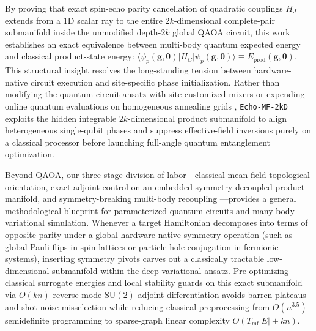\documentclass[10pt,a4paper]{article}
\begin{document}
By proving that exact spin-echo parity cancellation of quadratic couplings $H_J$ extends from a 1D scalar ray to the entire $2k$-dimensional complete-pair submanifold inside the unmodified depth-$2k$ global QAOA circuit, this work establishes an exact equivalence between multi-body quantum expected energy and classical product-state energy: $\langle\psi_p(\boldsymbol{g},\boldsymbol{\theta})|H_C|\psi_p(\boldsymbol{g},\boldsymbol{\theta})\rangle \equiv E_{\mathrm{prod}}(\boldsymbol{g},\boldsymbol{\theta})$. This structural insight resolves the long-standing tension between hardware-native circuit execution and site-specific phase initialization. Rather than modifying the quantum circuit ansatz with site-customized mixers \citep{egger2021warm,tate2023warm} or expending online quantum evaluations on homogeneous annealing grids \citep{sack2021quantum}, \texttt{Echo-MF-2kD} exploits the hidden integrable $2k$-dimensional product submanifold to align heterogeneous single-qubit phases and suppress effective-field inversions purely on a classical processor before launching full-angle quantum entanglement optimization.

Beyond QAOA, our three-stage division of labor---classical mean-field topological orientation, exact adjoint control on an embedded symmetry-decoupled product manifold, and symmetry-breaking multi-body recoupling \citep{dupont2022entanglement}---provides a general methodological blueprint for parameterized quantum circuits and many-body variational simulation. Whenever a target Hamiltonian decomposes into terms of opposite parity under a global hardware-native symmetry operation (such as global Pauli flips in spin lattices or particle-hole conjugation in fermionic systems), inserting symmetry pivots carves out a classically tractable low-dimensional submanifold within the deep variational ansatz. Pre-optimizing classical surrogate energies and local stability guards on this exact submanifold via $O(kn)$ reverse-mode $\mathrm{SU}(2)$ adjoint differentiation avoids barren plateaus and shot-noise misselection while reducing classical preprocessing from $O(n^{3.5})$ semidefinite programming to sparse-graph linear complexity $O(T_{\mathrm{mf}}|E| + kn)$.
\end{document}
